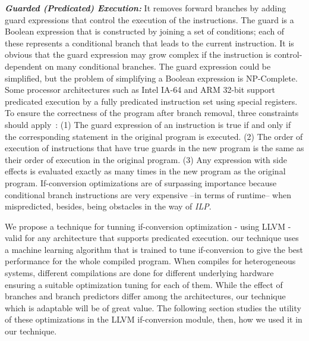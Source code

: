 \documentclass[preprint,nocopyrightspace]{sigplanconf}
\begin{document}
\textbf{\textit{Guarded (Predicated) Execution:}}
It removes forward branches by adding guard expressions that control the execution of the instructions. The guard is a Boolean expression that is constructed by joining a set of conditions; each of these represents a conditional branch that leads to the current instruction. It is obvious that the guard expression may grow complex if the instruction is control-dependent on many conditional branches. The guard expression could be simplified, but the problem of simplifying a Boolean expression is NP-Complete. Some processor architectures such as Intel IA-64 and ARM 32-bit support predicated execution by a fully predicated instruction set using special registers.
To ensure the correctness of the program after branch removal, three constraints should apply~\cite{OCMA02}:
(1) The guard expression of an instruction is true if and only if the corresponding statement in the original program is executed.
(2) The order of execution of instructions that have true guards in the new program is the same as their order of execution in the original program.
(3) Any expression with side effects is evaluated exactly as many times in the new program as the original program.
If-conversion optimizations are of surpassing importance because conditional branch instructions are very expensive --in terms of runtime-- when mispredicted, besides, being obstacles in the way of \textit{ILP}. 

We propose a technique for tunning if-conversion optimization - using LLVM - valid for any architecture that supports predicated execution. our technique uses a machine learning algorithm that is trained to tune if-conversion to give the best performance for the whole compiled program. When compiles for heterogeneous systems, different compilations are done for different underlying hardware ensuring a suitable optimization tuning for each of them. While the effect of branches and branch predictors differ among the architectures, our technique which is adaptable will be of great value.
The following section studies the utility of these optimizations in the LLVM if-conversion module, then, how we used it in our technique. 
\end{document}
